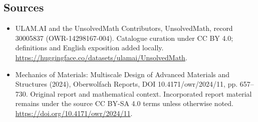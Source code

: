 \documentclass[11pt]{article}
\begin{document}
\subsection{Sources}
\begin{itemize}
\item[\hypertarget{source:30005837:1}{S1}] ULAM.AI and the UnsolvedMath Contributors, UnsolvedMath, record 30005837 (OWR-14298167-004). Catalogue curation under CC BY 4.0; definitions and English exposition added locally.
\url{https://huggingface.co/datasets/ulamai/UnsolvedMath}.
\item[\hypertarget{source:30005837:2}{S2}] Mechanics of Materials: Multiscale Design of Advanced Materials and Structures (2024), Oberwolfach Reports, DOI 10.4171/owr/2024/11, pp. 657--730. Original report and mathematical context. Incorporated report material remains under the source CC BY-SA 4.0 terms unless otherwise noted.
\url{https://doi.org/10.4171/owr/2024/11}.
\end{itemize}
\label{end:30005837}
\end{document}
